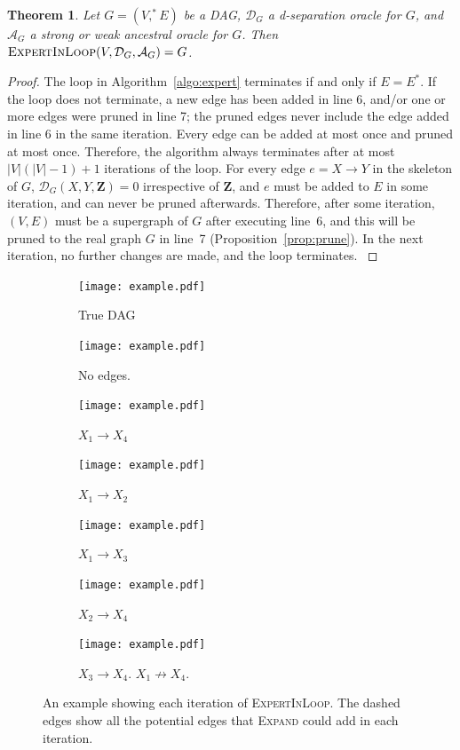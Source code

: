 \documentclass[accepted]{uai2025} %
\newtheorem{theorem}{Theorem}
\begin{document}
\begin{theorem}
Let $G=(V,^*E)$ be a DAG, $\mathcal{D}_G$ a d-separation oracle for $G$, and 
$\mathcal{A}_G$ a strong or weak ancestral oracle for $G$. Then 
$\textsc{ExpertInLoop}(V,\mathcal{D}_G,\mathcal{A}_G)=G$.
\end{theorem}

\begin{proof}
The loop in Algorithm~\ref{algo:expert} terminates if and 
only if $E=E^*$. If the loop does not  terminate, a new
 edge has been added in line 6, and/or one or more edges were 
pruned in line 7; the pruned edges never include the edge added 
in line 6 in the same iteration. Every edge can be added at 
most once and pruned at most once. Therefore, the algorithm 
always terminates after at most $|V|(|V|-1)+1$ iterations of
the loop. For every edge $e=X\to Y $ in the skeleton of $G$, 
$\mathcal{D}_G(X,Y,\mathbf{Z})=0$ irrespective of $\mathbf{Z}$, 
and $e$ must be added to $E$ in some iteration, and can never 
be pruned afterwards. Therefore, after some iteration, 
$(V,E)$ must be a supergraph of $G$ after executing line~6, 
and this will be pruned to the real graph $G$ in line~7 
(Proposition~\ref{prop:prune}). In the next iteration, 
no further changes are made, and the loop terminates.
\label{thm:itworks}
\end{proof} 


\begin{figure}[t!]
	\begin{subfigure}{0.125 \textwidth}
		\centering
		\texttt{[image: example.pdf]}
		\caption{True DAG}
	\end{subfigure}%
	\begin{subfigure}{0.125 \textwidth}
		\centering
		\texttt{[image: example.pdf]}
		\caption{No edges.}
	\end{subfigure}%
	\begin{subfigure}{0.125 \textwidth}
		\centering
		\texttt{[image: example.pdf]}
		\caption{$ X_1 \rightarrow X_4 $}
	\end{subfigure}%
	\begin{subfigure}{0.125 \textwidth}
		\centering
		\texttt{[image: example.pdf]}
		\caption{$ X_1 \rightarrow X_2 $}
	\end{subfigure}
	\begin{subfigure}{0.125 \textwidth}
		\centering
		\texttt{[image: example.pdf]}
		\caption{$ X_1 \rightarrow X_3 $}
	\end{subfigure}%
	\begin{subfigure}{0.125 \textwidth}
		\centering
		\texttt{[image: example.pdf]}
		\caption{$ X_2 \rightarrow X_4 $}
	\end{subfigure}%
	\begin{subfigure}{0.250 \textwidth}
		\centering
		\texttt{[image: example.pdf]}
		\caption{$ X_3 \rightarrow X_4 $. $ X_1 \not \rightarrow X_4 $.}
	\end{subfigure}
	\caption{An example showing each iteration of \textsc{ExpertInLoop}. The dashed edges show all the potential edges that \textsc{Expand} could add in each iteration.}
\end{figure}
\end{document}
